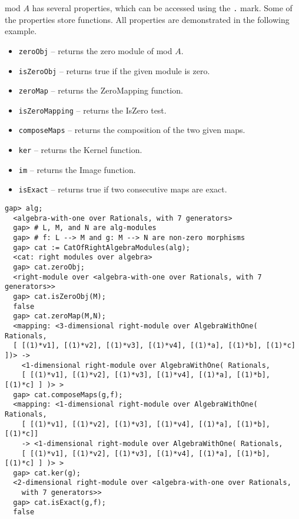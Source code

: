 \documentclass[a4paper,11pt]{report}
\begin{document}
{{{ mod $A$ has several properties, which can be accessed using the \texttt{.} mark. Some of the properties store functions. All properties are demonstrated
in the following example. 
\begin{itemize}
\item \texttt{zeroObj} -- returns the zero module of mod $A$.
\item \texttt{isZeroObj} -- returns true if the given module is zero.
\item \texttt{zeroMap} -- returns the ZeroMapping function.
\item \texttt{isZeroMapping} -- returns the IsZero test.
\item \texttt{composeMaps} -- returns the composition of the two given maps.
\item \texttt{ker} -- returns the Kernel function.
\item \texttt{im} -- returns the Image function.
\item \texttt{isExact} -- returns true if two consecutive maps are exact. 
\end{itemize}
 }

 
\begin{Verbatim}[fontsize=\small,frame=single,label=Example]
  gap> alg;
  <algebra-with-one over Rationals, with 7 generators>
  gap> # L, M, and N are alg-modules
  gap> # f: L --> M and g: M --> N are non-zero morphisms
  gap> cat := CatOfRightAlgebraModules(alg);
  <cat: right modules over algebra>
  gap> cat.zeroObj;
  <right-module over <algebra-with-one over Rationals, with 7 generators>>
  gap> cat.isZeroObj(M);
  false
  gap> cat.zeroMap(M,N);
  <mapping: <3-dimensional right-module over AlgebraWithOne( Rationals, 
  [ [(1)*v1], [(1)*v2], [(1)*v3], [(1)*v4], [(1)*a], [(1)*b], [(1)*c] ])> -> 
    <1-dimensional right-module over AlgebraWithOne( Rationals,
    [ [(1)*v1], [(1)*v2], [(1)*v3], [(1)*v4], [(1)*a], [(1)*b], [(1)*c] ] )> >
  gap> cat.composeMaps(g,f);
  <mapping: <1-dimensional right-module over AlgebraWithOne( Rationals, 
    [ [(1)*v1], [(1)*v2], [(1)*v3], [(1)*v4], [(1)*a], [(1)*b], [(1)*c]]
    -> <1-dimensional right-module over AlgebraWithOne( Rationals,
    [ [(1)*v1], [(1)*v2], [(1)*v3], [(1)*v4], [(1)*a], [(1)*b], [(1)*c] ] )> >
  gap> cat.ker(g);
  <2-dimensional right-module over <algebra-with-one over Rationals,
    with 7 generators>>
  gap> cat.isExact(g,f);
  false 
\end{Verbatim}
 }

 
}
\end{document}
